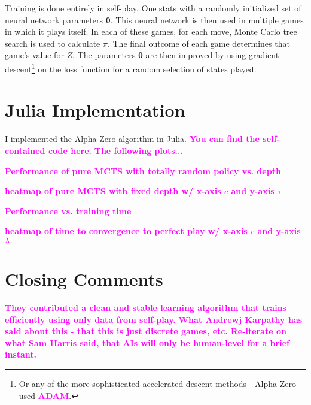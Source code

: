 \documentclass[10pt]{article}
\newcommand{\todo}[1]{\textbf{\textcolor{magenta}{#1}}}
\newcommand{\vect}[1]{\boldsymbol{\mathbf{#1}}}
\begin{document}
Training is done entirely in self-play.
One stats with a randomly initialized set of neural network parameters $\vect \theta$.
This neural network is then used in multiple games in which it plays itself.
In each of these games, for each move, Monte Carlo tree search is used to calculate $\pi$.
The final outcome of each game determines that game's value for $Z$.
The parameters $\vect \theta$ are then improved by using gradient descent\footnote{Or any of the more sophisticated accelerated descent methods---Alpha Zero used \todo{ADAM}.} on the loss function for a random selection of states played.

\section*{Julia Implementation}

I implemented the Alpha Zero algorithm in Julia.
\todo{You can find the self-contained code here.}
\todo{The following plots...}

\todo{Performance of pure MCTS with totally random policy vs. depth}

\todo{heatmap of pure MCTS with fixed depth w/ x-axis $c$ and y-axis $\tau$}

\todo{Performance vs. training time} %

\todo{heatmap of time to convergence to perfect play w/ x-axis $c$ and y-axis $\lambda$}

\section*{Closing Comments}

\todo{They contributed a clean and stable learning algorithm that trains efficiently using only data from self-play.}
\todo{What Andrewj Karpathy has said about this - that this is just discrete games, etc.}
\todo{Re-iterate on what Sam Harris said, that AIs will only be human-level for a brief instant.}
\end{document}
